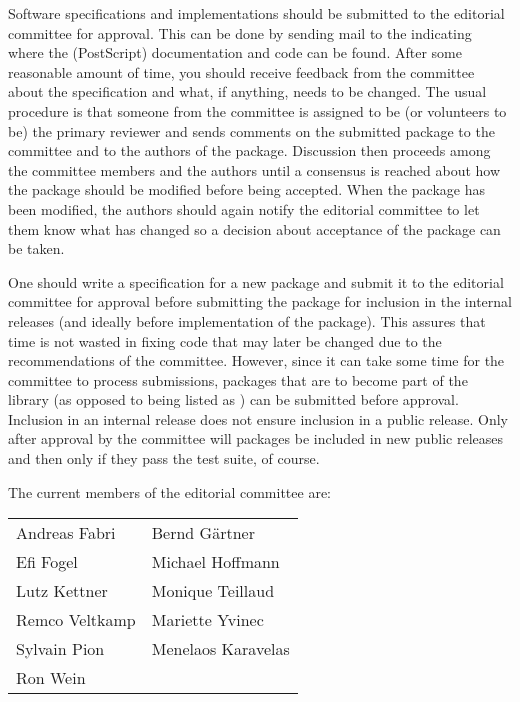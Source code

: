 Software specifications and implementations should be submitted to the 
editorial committee for approval.  This can be done by sending mail to 
the 
 indicating
where the (PostScript) documentation and code can be found.  After
some reasonable amount of time, you should receive feedback from 
the committee about the specification and what, if anything, needs to
be changed. The usual procedure is that someone from the committee is
assigned to be (or volunteers to be) the primary reviewer and sends 
comments on the submitted package to the committee and to the authors of
the package.  Discussion then proceeds among the committee members and the
authors until a consensus is reached about how the package should be
modified before being accepted.  When the package has been modified,
the authors should again notify the editorial committee to let them
know what has changed so a decision about acceptance of the package
can be taken.  


One should write a specification for a new package
and submit it to the editorial committee for 
approval before submitting the package for inclusion in the internal
releases (and ideally before implementation of the package).  This
assures that time is not wasted in fixing code that may later be changed
due to the recommendations of the committee.
However, since it can take some time for the committee to process
submissions, packages that are to become part of the library 
(as opposed to being listed as 
)
can be submitted 
 before approval.
Inclusion in an internal release does not ensure inclusion in a public
release.  Only after approval by the committee will packages be included in new
public releases and then only if they pass the test suite, of course.

The current members of the editorial committee are:
\begin{center}
\begin{tabular}{p{5cm}p{5cm}}
Andreas Fabri          & Bernd G\"artner  \\
Efi Fogel              & Michael Hoffmann \\
Lutz Kettner           & Monique Teillaud  \\
Remco Veltkamp         & Mariette Yvinec  \\
Sylvain Pion           & Menelaos Karavelas\\
Ron Wein
\end{tabular}
\end{center}

